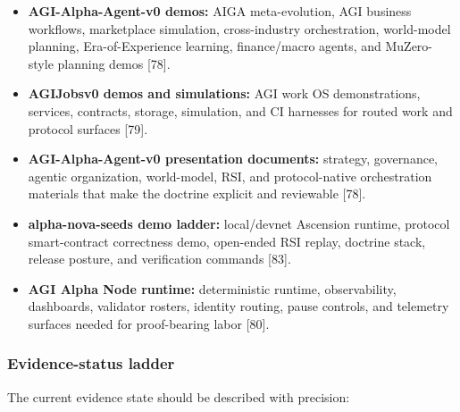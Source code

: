 \begin{itemize}
\tightlist
\item
  \textbf{AGI-Alpha-Agent-v0 demos:} AIGA meta-evolution, AGI business
  workflows, marketplace simulation, cross-industry orchestration,
  world-model planning, Era-of-Experience learning, finance/macro
  agents, and MuZero-style planning demos {[}78{]}.
\item
  \textbf{AGIJobsv0 demos and simulations:} AGI work OS demonstrations,
  services, contracts, storage, simulation, and CI harnesses for routed
  work and protocol surfaces {[}79{]}.
\item
  \textbf{AGI-Alpha-Agent-v0 presentation documents:} strategy,
  governance, agentic organization, world-model, RSI, and
  protocol-native orchestration materials that make the doctrine
  explicit and reviewable {[}78{]}.
\item
  \textbf{alpha-nova-seeds demo ladder:} local/devnet Ascension runtime,
  protocol smart-contract correctness demo, open-ended RSI replay,
  doctrine stack, release posture, and verification commands {[}83{]}.
\item
  \textbf{AGI Alpha Node runtime:} deterministic runtime, observability,
  dashboards, validator rosters, identity routing, pause controls, and
  telemetry surfaces needed for proof-bearing labor {[}80{]}.
\end{itemize}

\subsubsection{Evidence-status ladder}\label{evidence-status-ladder}

The current evidence state should be described with precision:

